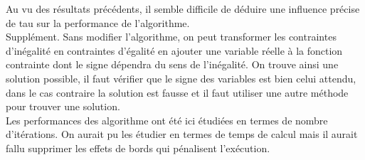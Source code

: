 \documentclass[a4paper,12pt]{article}
\begin{document}
Au vu des résultats précédents, il semble difficile de déduire une influence précise de tau sur la performance de l'algorithme.\\

Supplément.
Sans modifier l'algorithme, on peut transformer les contraintes d'inégalité en contraintes d'égalité en ajouter une variable réelle à la fonction contrainte dont le signe dépendra du sens de l'inégalité. On trouve ainsi une solution possible, il faut vérifier que le signe des variables est bien celui attendu, dans le cas contraire la solution est fausse et il faut utiliser une autre méthode pour trouver une solution.\\


\bigskip
Les performances des algorithme ont été ici étudiées en termes de nombre d'itérations. On aurait pu les étudier en termes de temps de calcul mais il aurait fallu supprimer les effets de bords qui pénalisent l’exécution.
\end{document}
